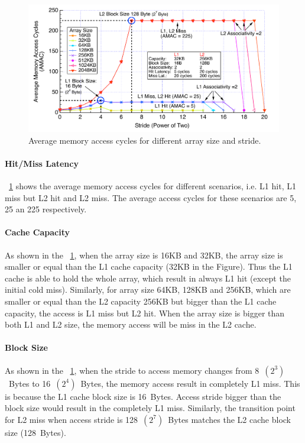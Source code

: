 \documentclass[12pt]{report}
\newcommand{\Fig}[1]{\figurename~\ref{#1}}
\begin{document}
\begin{figure}[!h]
\begin{minipage}[b]{\textwidth}
 \centering
 \includegraphics[trim=0mm 0mm 0mm 0mm,clip,width=\linewidth]{figs/autotest.pdf}
 \caption{Average memory access cycles for different array size and stride.}
 \label{fig:autotest_result}
\end{minipage}
\end{figure}

\paragraph{Hit/Miss Latency}
\Fig{fig:autotest_result} shows the average memory access cycles for different scenarios, i.e. L1 hit, L1 miss but L2 hit and L2 miss. The average access cycles for these scenarios are 5, 25 an 225 respectively. 

\paragraph{Cache Capacity}
As shown in the \Fig{fig:autotest_result}, when the array size is 16KB and 32KB, the array size is smaller or equal than the L1 cache capacity (32KB in the Figure). Thus the L1 cache is able to hold the whole array, which result in always L1 hit (except the initial cold miss). Similarly, for array size 64KB, 128KB and 256KB, which are smaller or equal than the L2 capacity 256KB but bigger than the L1 cache capacity, the access is L1 miss but L2 hit. When the array size is bigger than both L1 and L2 size, the memory access will be miss in the L2 cache.

\paragraph{Block Size}
As shown in the \Fig{fig:autotest_result}, when the stride to access memory changes from 8~$(2^3)$~Bytes to 16~$(2^4)$~Bytes, the memory access result in completely L1 miss. This is because the L1 cache block size is 16~Bytes. Access stride bigger than the block size would result in the completely L1 miss. Similarly, the transition point for L2 miss when access stride is 128~$(2^7)$~Bytes matches the L2 cache block size (128~Bytes).
\end{document}

